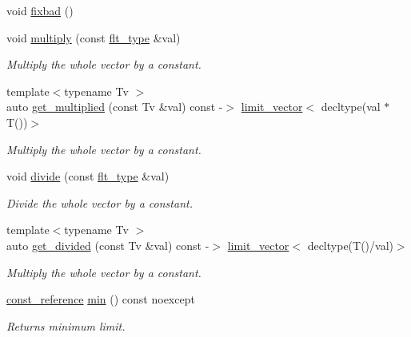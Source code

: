 \begin{DoxyCompactItemize}
void \hyperlink{classIceBRG_1_1limit__vector_ae34c3659f8203ea285a5f81c9a5beb21}{fixbad} ()
\item 
void \hyperlink{classIceBRG_1_1limit__vector_a325027b05e079aa836725e4e66576026}{multiply} (const \hyperlink{lib_2IceBRG__main_2common_8h_ad0f130a56eeb944d9ef2692ee881ecc4}{flt\+\_\+type} \&val)
\begin{DoxyCompactList}\small\item\em Multiply the whole vector by a constant. \end{DoxyCompactList}\item 
{\footnotesize template$<$typename Tv $>$ }\\auto \hyperlink{classIceBRG_1_1limit__vector_aeb944f9e344296d0b8c8501f2b2cf360}{get\+\_\+multiplied} (const Tv \&val) const  -\/$>$ \hyperlink{classIceBRG_1_1limit__vector}{limit\+\_\+vector}$<$ decltype(val $\ast$T())$>$
\begin{DoxyCompactList}\small\item\em Multiply the whole vector by a constant. \end{DoxyCompactList}\item 
void \hyperlink{classIceBRG_1_1limit__vector_a1564579561d66d38f339bd109d2a25fd}{divide} (const \hyperlink{lib_2IceBRG__main_2common_8h_ad0f130a56eeb944d9ef2692ee881ecc4}{flt\+\_\+type} \&val)
\begin{DoxyCompactList}\small\item\em Divide the whole vector by a constant. \end{DoxyCompactList}\item 
{\footnotesize template$<$typename Tv $>$ }\\auto \hyperlink{classIceBRG_1_1limit__vector_ae30b0b186d5121820e050f9e8a84fb03}{get\+\_\+divided} (const Tv \&val) const  -\/$>$ \hyperlink{classIceBRG_1_1limit__vector}{limit\+\_\+vector}$<$ decltype(T()/val)$>$
\begin{DoxyCompactList}\small\item\em Multiply the whole vector by a constant. \end{DoxyCompactList}\item 
\hyperlink{classIceBRG_1_1limit__vector_aed6fc504d7987040be16d150089c7893}{const\+\_\+reference} \hyperlink{classIceBRG_1_1limit__vector_a6dddba344399189344e410ddca2615d6}{min} () const  noexcept
\begin{DoxyCompactList}\small\item\em Returns minimum limit. \end{DoxyCompactList}\item 

\end{DoxyCompactItemize}
